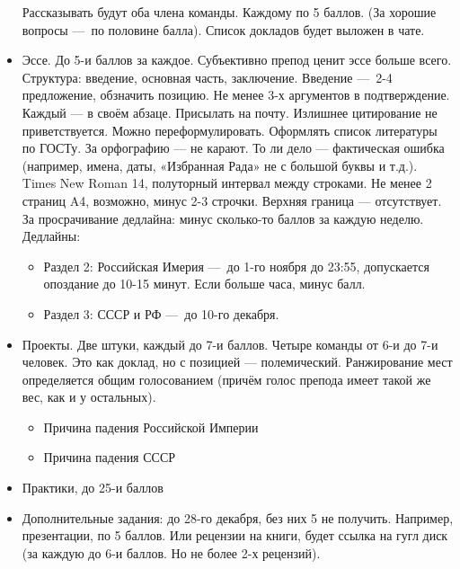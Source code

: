 \documentclass[12pt, a4paper]{article}
\begin{document}
\begin{itemize}
        Рассказывать будут оба члена команды. Каждому по 5 баллов. (За хорошие вопросы — по половине балла). 
        Список докладов будет выложен в чате.
        \item Эссе. До 5-и баллов за каждое. Субъективно препод ценит эссе больше всего. Структура: введение, основная часть, заключение.
        Введение — 2-4 предложение, обзначить позицию.
        Не менее 3-х аргументов в подтверждение. Каждый — в своём абзаце. Присылать на почту. 
        Излишнее цитирование не приветствуется. Можно переформулировать.
        Оформлять список литературы по ГОСТу.
        За орфографию — не карают. То ли дело — фактическая ошибка (например, имена, даты, «Избранная Рада» не с большой буквы и т.д.).
        Times New Roman 14, полуторный интервал между строками. Не менее 2 страниц A4, возможно, минус 2-3 строчки. Верхняя граница — отсутствует. 
        За просрачивание дедлайна: минус сколько-то баллов за каждую неделю. Дедлайны:
        \begin{itemize}
            \item Раздел 2: Российская Имерия — до 1-го ноября до 23:55, допускается опоздание до 10-15 минут. Если больше часа, минус балл.
            \item Раздел 3: СССР и РФ — до 10-го декабря.
        \end{itemize}
        \item Проекты. Две штуки, каждый до 7-и баллов.
        Четыре команды от 6-и до 7-и человек.
        Это как доклад, но с позицией — полемический.
        Ранжирование мест определяется общим голосованием (причём голос препода имеет такой же вес, как и у остальных).
        \begin{itemize}
            \item Причина падения Российской Империи
            \item Причина падения СССР
        \end{itemize}
        \item Практики, до 25-и баллов
        \item Дополнительные задания: до 28-го декабря, без них 5 не получить. Например, презентации, по 5 баллов. 
        Или рецензии на книги, будет ссылка на гугл диск (за каждую до 6-и баллов. Но не более 2-х рецензий).
            
    \end{itemize}
\end{document}
